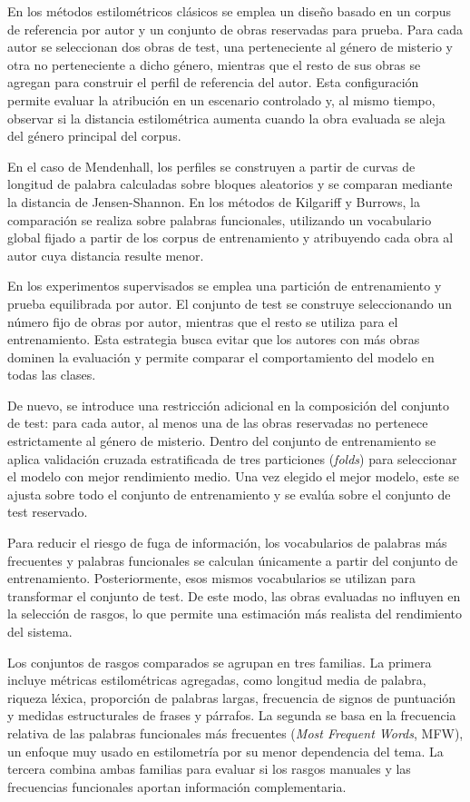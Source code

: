 \documentclass[IB]{TFUOC}%
\begin{document}
En los métodos estilométricos clásicos se emplea un diseño basado en un corpus de referencia por autor y un conjunto de obras reservadas para prueba. Para cada autor se seleccionan dos obras de test, una perteneciente al género de misterio y otra no perteneciente a dicho género, mientras que el resto de sus obras se agregan para construir el perfil de referencia del autor. Esta configuración permite evaluar la atribución en un escenario controlado y, al mismo tiempo, observar si la distancia estilométrica aumenta cuando la obra evaluada se aleja del género principal del corpus.

En el caso de Mendenhall, los perfiles se construyen a partir de curvas de longitud de palabra calculadas sobre bloques aleatorios y se comparan mediante la distancia de Jensen-Shannon. En los métodos de Kilgariff y Burrows, la comparación se realiza sobre palabras funcionales, utilizando un vocabulario global fijado a partir de los corpus de entrenamiento y atribuyendo cada obra al autor cuya distancia resulte menor.

En los experimentos supervisados se emplea una partición de entrenamiento y prueba equilibrada por autor. El conjunto de test se construye seleccionando un número fijo de obras por autor, mientras que el resto se utiliza para el entrenamiento. Esta estrategia busca evitar que los autores con más obras dominen la evaluación y permite comparar el comportamiento del modelo en todas las clases.

De nuevo, se introduce una restricción adicional en la composición del conjunto de test: para cada autor, al menos una de las obras reservadas no pertenece estrictamente al género de misterio. Dentro del conjunto de entrenamiento se aplica validación cruzada estratificada de tres particiones (\textit{folds}) para seleccionar el modelo con mejor rendimiento medio. Una vez elegido el mejor modelo, este se ajusta sobre todo el conjunto de entrenamiento y se evalúa sobre el conjunto de test reservado.

Para reducir el riesgo de fuga de información, los vocabularios de palabras más frecuentes y palabras funcionales se calculan únicamente a partir del conjunto de entrenamiento. Posteriormente, esos mismos vocabularios se utilizan para transformar el conjunto de test. De este modo, las obras evaluadas no influyen en la selección de rasgos, lo que permite una estimación más realista del rendimiento del sistema.

Los conjuntos de rasgos comparados se agrupan en tres familias. La primera incluye métricas estilométricas agregadas, como longitud media de palabra, riqueza léxica, proporción de palabras largas, frecuencia de signos de puntuación y medidas estructurales de frases y párrafos. La segunda se basa en la frecuencia relativa de las palabras funcionales más frecuentes (\textit{Most Frequent Words}, MFW), un enfoque muy usado en estilometría por su menor dependencia del tema. La tercera combina ambas familias para evaluar si los rasgos manuales y las frecuencias funcionales aportan información complementaria.
\end{document}
